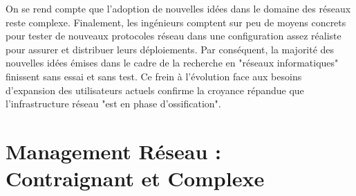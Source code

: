 
On se rend compte que l'adoption de nouvelles idées dans le domaine des réseaux reste complexe.  Finalement, les ingénieurs comptent sur peu de moyens concrets pour tester de nouveaux protocoles réseau dans une configuration assez réaliste pour assurer et distribuer leurs déploiements. Par conséquent, la majorité des nouvelles idées émises dans le cadre de la recherche en "réseaux informatiques" finissent sans essai et sans test. Ce frein à l'évolution face aux besoins d'expansion des utilisateurs actuels confirme la croyance répandue que l'infrastructure réseau "est en phase d'ossification". \cite{OpenFlowStanfordOssification} 


\section{Management Réseau : Contraignant et Complexe}






